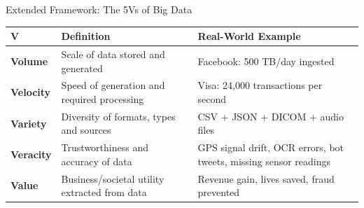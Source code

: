 \documentclass[aspectratio=169,10pt]{beamer}
\begin{document}
\begin{frame}{Extended Framework: The 5Vs of Big Data}
  \centering
  \renewcommand{\arraystretch}{1.45}
  \begin{tabular}{p{1.8cm}p{4.5cm}p{5.2cm}}
    \toprule
    \textbf{V} & \textbf{Definition} & \textbf{Real-World Example} \\
    \midrule
    \alert{\textbf{Volume}} &
      Scale of data stored and generated &
      Facebook: 500 TB/day ingested \\

    \alert{\textbf{Velocity}} &
      Speed of generation and required processing &
      Visa: 24{,}000 transactions per second \\

    \alert{\textbf{Variety}} &
      Diversity of formats, types and sources &
      CSV + JSON + DICOM + audio files \\

    \textbf{Veracity} &
      Trustworthiness and accuracy of data &
      GPS signal drift, OCR errors, bot tweets, missing sensor readings \\

    \textbf{Value} &
      Business/societal utility extracted from data &
      Revenue gain, lives saved, fraud prevented \\
    \bottomrule
  \end{tabular}
\end{frame}
\end{document}
